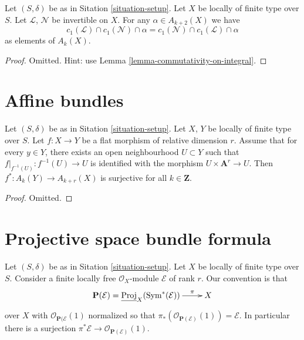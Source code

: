 \begin{lemma}
\label{lemma-cap-commutative}
Let $(S, \delta)$ be as in Sitation \ref{situation-setup}.
Let $X$ be locally of finite type over $S$.
Let $\mathcal{L}$, $\mathcal{N}$ be invertible on $X$.
For any $\alpha \in A_{k + 2}(X)$ we have
$$
c_1(\mathcal{L}) \cap c_1(\mathcal{N}) \cap \alpha
=
c_1(\mathcal{N}) \cap c_1(\mathcal{L}) \cap \alpha
$$
as elements of $A_k(X)$.
\end{lemma}

\begin{proof}
Omitted. Hint: use Lemma \ref{lemma-commutativity-on-integral}.
\end{proof}









\section{Affine bundles}
\label{section-affine-vector}

\begin{lemma}
\label{lemma-pullback-affine-fibres-surjective}
Let $(S, \delta)$ be as in Sitation \ref{situation-setup}.
Let $X$, $Y$ be locally of finite type over $S$.
Let $f : X \to Y$ be a flat morphism of relative dimension $r$.
Assume that for every $y \in Y$, there exists an open neighbourhood
$U \subset Y$ such that $f|_{f^{-1}(U)} : f^{-1}(U) \to U$
is identified with the morphism $U \times \mathbf{A}^r \to U$.
Then $f^* : A_k(Y) \to A_{k + r}(X)$ is surjective for all
$k \in \mathbf{Z}$.
\end{lemma}

\begin{proof}
Omitted.
\end{proof}






\section{Projective space bundle formula}
\label{section-projective-space-bundle-formula}

\noindent
Let $(S, \delta)$ be as in Sitation \ref{situation-setup}.
Let $X$ be locally of finite type over $S$.
Consider a finite locally free $\mathcal{O}_X$-module
$\mathcal{E}$ of rank $r$.
Our convention is that
$$
\xymatrix{
\mathbf{P}(\mathcal{E})
=
\underline{\text{Proj}}_X(\text{Sym}^*(\mathcal{E}))
\ar[r]^-\pi
& X
}
$$
over $X$ with
$\mathcal{O}_{\mathbf{P}(\mathcal{E}}(1)$ normalized so that
$\pi_*(\mathcal{O}_{\mathbf{P}(\mathcal{E})}(1)) = \mathcal{E}$.
In particular there is a surjection
$\pi^*\mathcal{E} \to \mathcal{O}_{\mathbf{P}(\mathcal{E})}(1)$.


